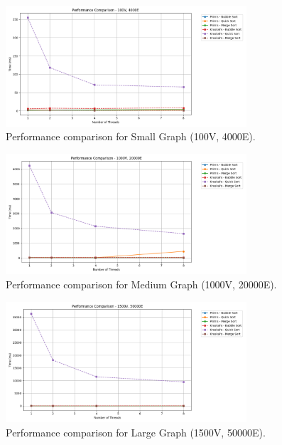 \documentclass[11pt]{article}
\begin{document}
\begin{figure}[H]
    \centering
    \includegraphics[width=0.8\textwidth]{small_comparison.png}
    \caption{Performance comparison for Small Graph (100V, 4000E).}
    \label{fig:small_comparison}
\end{figure}

\begin{figure}[H]
    \centering
    \includegraphics[width=0.8\textwidth]{medium_comparison.png}
    \caption{Performance comparison for Medium Graph (1000V, 20000E).}
    \label{fig:medium_comparison}
\end{figure}

\begin{figure}[H]
    \centering
    \includegraphics[width=0.8\textwidth]{large_comparison.png}
    \caption{Performance comparison for Large Graph (1500V, 50000E).}
    \label{fig:large_comparison}
\end{figure}
\end{document}
